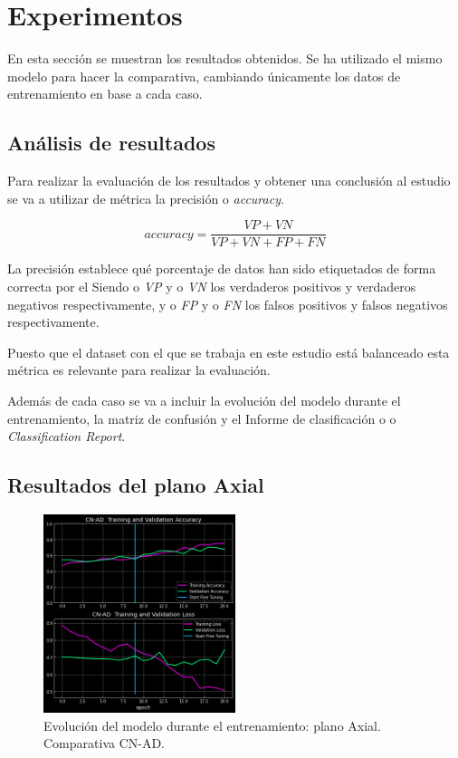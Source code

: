 \section{Experimentos}\label{sec:experimentos}
En esta sección se muestran los resultados obtenidos.
Se ha utilizado el mismo modelo para hacer la comparativa, cambiando únicamente los datos de entrenamiento en base a
cada caso.

\subsection{Análisis de resultados}\label{subsec:analisis-de-resultados}
Para realizar la evaluación de los resultados y obtener una conclusión al estudio se va a utilizar de
métrica la precisión o \textit{accuracy}.

    \[accuracy=\frac{VP+VN}{VP+VN+FP+FN}\]

La precisión establece qué porcentaje de datos han sido etiquetados de forma correcta por el
Siendo o \textit{VP} y o \textit{VN} los verdaderos positivos y verdaderos negativos respectivamente,
y o \textit{FP} y o \textit{FN} los falsos positivos y falsos negativos respectivamente.

Puesto que el dataset con el que se trabaja en este estudio está balanceado esta métrica es relevante para realizar
la evaluación.

Además de cada caso se va a incluir la evolución del modelo durante el entrenamiento, la matriz de confusión y el
Informe de clasificación o o \textit{Classification Report}.


\subsection{Resultados del plano Axial}\label{subsec:resultados-del-plano-axial}

\begin{figure}[H]
    \centering
    \includegraphics[width=0.5\textwidth]{./imgs/resultados/axial/CN_AD_output_AXIAL}
    \caption{Evolución del modelo durante el entrenamiento: plano Axial. Comparativa CN-AD. }
    \label{fig:axial-cn-ad}
\end{figure}

